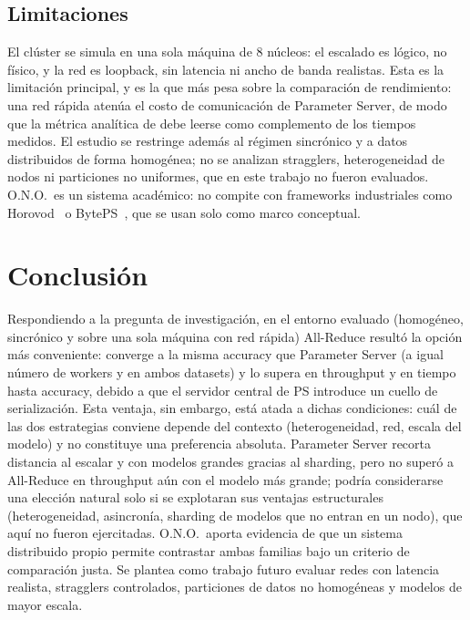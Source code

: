 \documentclass[conference,10pt]{IEEEtran}
\begin{document}


\subsection{Limitaciones}\label{sec:limits}
El cl\'uster se simula en una sola m\'aquina de 8 n\'ucleos: el escalado es l\'ogico, no
f\'isico, y la red es loopback, sin latencia ni ancho de banda realistas. Esta es la
limitaci\'on principal, y es la que m\'as pesa sobre la comparaci\'on de rendimiento: una
red r\'apida aten\'ua el costo de comunicaci\'on de Parameter Server, de modo que la
m\'etrica anal\'itica de  debe leerse como complemento de los tiempos
medidos. El estudio se restringe adem\'as al r\'egimen sincr\'onico y a datos
distribuidos de forma homog\'enea; no se analizan stragglers, heterogeneidad de nodos ni
particiones no uniformes, que en este trabajo no fueron evaluados. O.N.O.\ es un sistema
acad\'emico: no compite con frameworks industriales como
Horovod~\cite{sergeev2018horovod} o BytePS~\cite{jiang2020byteps}, que se usan solo como
marco conceptual.

\FloatBarrier
\section{Conclusi\'on}
Respondiendo a la pregunta de investigaci\'on, en el entorno evaluado (homog\'eneo,
sincr\'onico y sobre una sola m\'aquina con red r\'apida) All-Reduce result\'o la opci\'on
m\'as conveniente: converge a la misma accuracy que Parameter Server (a igual n\'umero de
workers y en ambos datasets) y lo supera en throughput y en tiempo hasta accuracy, debido
a que el servidor central de PS introduce un cuello de serializaci\'on. Esta ventaja, sin
embargo, est\'a atada a dichas condiciones: cu\'al de las dos estrategias conviene depende
del contexto (heterogeneidad, red, escala del modelo) y no constituye una preferencia
absoluta. Parameter Server recorta distancia al escalar y con modelos grandes gracias al sharding,
pero no super\'o a All-Reduce en throughput a\'un con el modelo m\'as grande; podr\'ia
considerarse una elecci\'on natural solo si se explotaran sus ventajas estructurales
(heterogeneidad, asincron\'ia, sharding de modelos que no entran en un nodo), que aqu\'i
no fueron ejercitadas. O.N.O.\ aporta evidencia de que un sistema distribuido propio
permite contrastar ambas familias bajo un criterio de comparaci\'on justa. Se plantea como
trabajo futuro evaluar redes con latencia realista, stragglers controlados, particiones
de datos no homog\'eneas y modelos de mayor escala.



\end{document}
